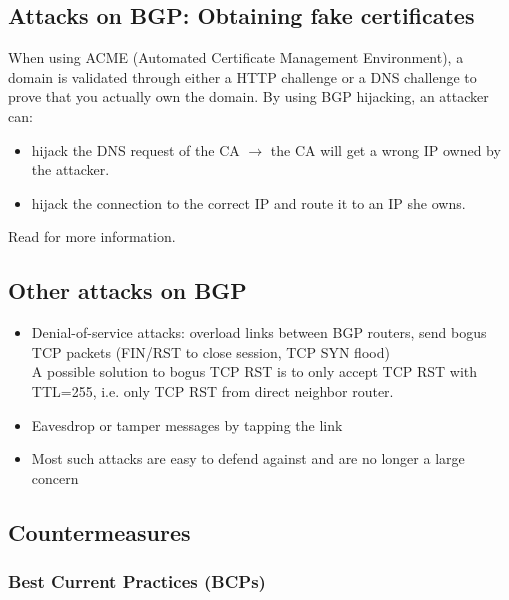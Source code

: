 \documentclass[11pt,oneside,a4paper]{article}
\begin{document}
\subsection{Attacks on BGP: Obtaining fake certificates}

When using ACME (Automated Certificate Management Environment), a domain is validated through either a HTTP challenge or a DNS challenge to prove that you actually own the domain. By using BGP hijacking, an attacker can:

\vspace{-\topsep}
\begin{itemize}
	\setlength{\itemsep}{0pt}
	\setlength{\parskip}{0pt}
	\item hijack the DNS request of the CA $\rightarrow$ the CA will get a wrong IP owned by the attacker.
	\item hijack the connection to the correct IP and route it to an IP she owns.
\end{itemize}
\vspace{-\topsep}

\noindent Read \cite{bgp_fake_cert} for more information.

\subsection{Other attacks on BGP}

\begin{itemize}
	\setlength{\itemsep}{0pt}
	\setlength{\parskip}{0pt}
	\item Denial-of-service attacks: overload links between BGP routers, send bogus TCP packets (FIN/RST to close session, TCP SYN flood)\\
	A possible solution to bogus TCP RST is to only accept TCP RST with TTL=255, i.e. only TCP RST from direct neighbor router.
	\item Eavesdrop or tamper messages by tapping the link
	\item Most such attacks are easy to defend against and are no longer a large concern
\end{itemize}
\vspace{-\topsep}

\newpage

\subsection{Countermeasures}

\subsubsection{Best Current Practices (BCPs)}
\end{document}
